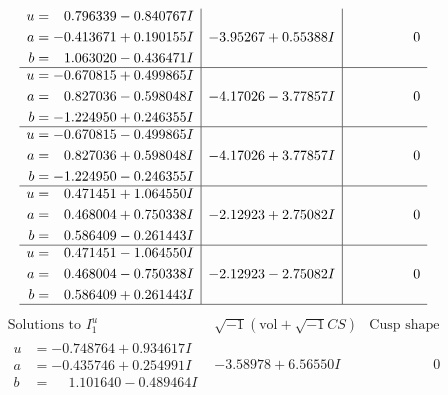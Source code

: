 \documentclass[1p]{elsarticle_modified}
\theoremstyle{definition}
\newcommand{\I}{\sqrt{-1}}
\begin{document}
$$\begin{array}{c|c|c}
\begin{aligned}
u &= \phantom{-}0.796339 - 0.840767 I \\
a &= -0.413671 + 0.190155 I \\
b &= \phantom{-}1.063020 - 0.436471 I\end{aligned}
 & -3.95267 + 0.55388 I & \phantom{-0.000000 } 0 \\ \hline\begin{aligned}
u &= -0.670815 + 0.499865 I \\
a &= \phantom{-}0.827036 - 0.598048 I \\
b &= -1.224950 + 0.246355 I\end{aligned}
 & -4.17026 - 3.77857 I & \phantom{-0.000000 } 0 \\ \hline\begin{aligned}
u &= -0.670815 - 0.499865 I \\
a &= \phantom{-}0.827036 + 0.598048 I \\
b &= -1.224950 - 0.246355 I\end{aligned}
 & -4.17026 + 3.77857 I & \phantom{-0.000000 } 0 \\ \hline\begin{aligned}
u &= \phantom{-}0.471451 + 1.064550 I \\
a &= \phantom{-}0.468004 + 0.750338 I \\
b &= \phantom{-}0.586409 - 0.261443 I\end{aligned}
 & -2.12923 + 2.75082 I & \phantom{-0.000000 } 0 \\ \hline\begin{aligned}
u &= \phantom{-}0.471451 - 1.064550 I \\
a &= \phantom{-}0.468004 - 0.750338 I \\
b &= \phantom{-}0.586409 + 0.261443 I\end{aligned}
 & -2.12923 - 2.75082 I & \phantom{-0.000000 } 0\\
 \hline 
 \end{array}$$\newpage$$\begin{array}{c|c|c}  
\text{Solutions to }I^u_{1}& \I (\text{vol} + \sqrt{-1}CS) & \text{Cusp shape}\\
 \hline 
\begin{aligned}
u &= -0.748764 + 0.934617 I \\
a &= -0.435746 + 0.254991 I \\
b &= \phantom{-}1.101640 - 0.489464 I\end{aligned}
 & -3.58978 + 6.56550 I & \phantom{-0.000000 } 0 \\ \hline\begin{aligned}

\end{aligned}
\end{array}$$
\end{document}
